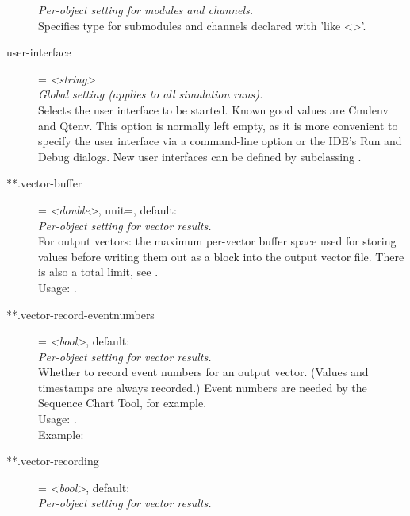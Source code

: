 \begin{description}
    \textit{Per-object setting for modules and channels.}\\
    Specifies type for submodules and channels declared with 'like <>'.
\item[user-interface] = \textit{<string>}\\
    \textit{Global setting (applies to all simulation runs).}\\
    Selects the user interface to be started. Known good values are Cmdenv and
    Qtenv. This option is normally left empty, as it is more convenient to
    specify the user interface via a command-line option or the IDE's Run and
    Debug dialogs. New user interfaces can be defined by subclassing
    .
\item[**.vector-buffer] = \textit{<double>}, unit=, default: \\
    \textit{Per-object setting for vector results.}\\
    For output vectors: the maximum per-vector buffer space used for storing
    values before writing them out as a block into the output vector file.
    There is also a total limit, see
    .\\
    Usage:
    .
\item[**.vector-record-eventnumbers] = \textit{<bool>}, default: \\
    \textit{Per-object setting for vector results.}\\
    Whether to record event numbers for an output vector. (Values and
    timestamps are always recorded.) Event numbers are needed by the Sequence
    Chart Tool, for example.\\
    Usage:
    .\\
    Example:
\item[**.vector-recording] = \textit{<bool>}, default: \\
    \textit{Per-object setting for vector results.}\\

\end{description}
